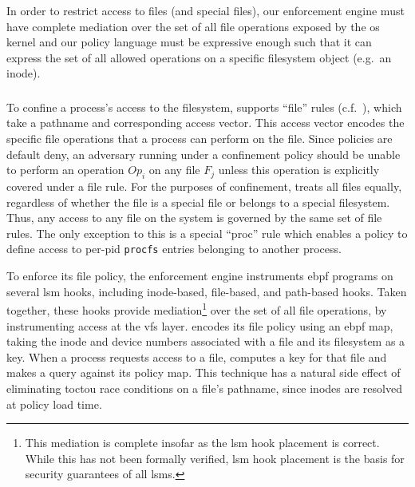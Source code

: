 In order to restrict access to files (and special files), our enforcement engine must have
complete mediation over the set of all file operations exposed by the \gls{os} kernel and
our policy language must be expressive enough such that it can express the set of all
allowed operations on a specific filesystem object (e.g.\ an inode).

\subsubsection{\bpfbox{}}

To confine a process's access to the filesystem, \bpfbox{} supports \enquote{file} rules
(c.f.\ ), which take a pathname and corresponding access
vector. This access vector encodes the specific file operations that a process can perform
on the file. Since \bpfbox{} policies are default deny, an adversary running under
a \bpfbox{} confinement policy should be unable to perform an operation $Op_i$ on any file
$F_j$ unless this operation is explicitly covered under a file rule. For the purposes of
confinement, \bpfbox{} treats all files equally, regardless of whether the file is
a special file or belongs to a special filesystem. Thus, any access to any file on the
system is governed by the same set of file rules. The only exception to this is a special
\enquote{proc} rule which enables a policy to define access to per-pid \texttt{procfs}
entries belonging to another process.

To enforce its file policy, the \bpfbox{} enforcement engine instruments \gls{ebpf}
programs on several \gls{lsm} hooks, including inode-based, file-based, and path-based
hooks. Taken together, these hooks provide mediation\footnote{This mediation is complete
insofar as the \gls{lsm} hook placement is correct. While this has not been formally
verified, \gls{lsm} hook placement is the basis for security guarantees of all
\glspl{lsm}.} over the set of all file operations, by instrumenting access at the
\gls{vfs} layer. \bpfbox{} encodes its file policy using an \gls{ebpf} map, taking the
inode and device numbers associated with a file and its filesystem as a key. When
a process requests access to a file, \bpfbox{} computes a key for that file and makes
a query against its policy map. This technique has a natural side effect of eliminating
\gls{toctou} race conditions on a file's pathname, since inodes are resolved at policy
load time.

